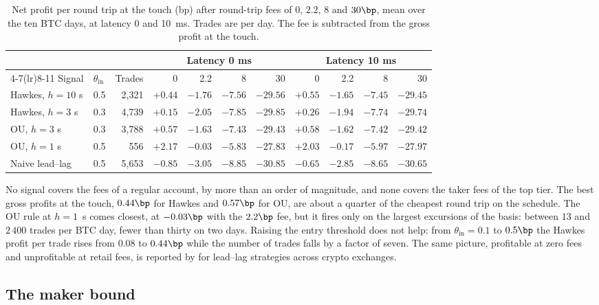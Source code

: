 \documentclass[a4paper,11pt]{article}
\begin{document}
\begin{table}[!htb]
\centering
\caption{Net profit per round trip at the touch (bp) after round-trip fees of $0$, $2.2$, $8$ and $30\bp$, mean over the ten BTC days, at latency 0 and 10~ms. Trades are per day. The fee is subtracted from the gross profit at the touch.}
\label{tab:costs}
\footnotesize
\setlength{\tabcolsep}{4pt}
\begin{tabular}{@{}llrrrrrrrrr@{}}
\toprule
 & & & \multicolumn{4}{c}{Latency 0 ms} & \multicolumn{4}{c}{Latency 10 ms} \\
\cmidrule(lr){4-7}\cmidrule(lr){8-11}
Signal & $\theta_{\mathrm{in}}$ & Trades & 0 & 2.2 & 8 & 30 & 0 & 2.2 & 8 & 30 \\
\midrule
Hawkes, $h = 10$ s & 0.5 & 2,321 & $+0.44$ & $-1.76$ & $-7.56$ & $-29.56$ & $+0.55$ & $-1.65$ & $-7.45$ & $-29.45$ \\
Hawkes, $h = 3$ s & 0.3 & 4,739 & $+0.15$ & $-2.05$ & $-7.85$ & $-29.85$ & $+0.26$ & $-1.94$ & $-7.74$ & $-29.74$ \\
OU, $h = 3$ s & 0.3 & 3,788 & $+0.57$ & $-1.63$ & $-7.43$ & $-29.43$ & $+0.58$ & $-1.62$ & $-7.42$ & $-29.42$ \\
OU, $h = 1$ s & 0.5 & 556 & $+2.17$ & $-0.03$ & $-5.83$ & $-27.83$ & $+2.03$ & $-0.17$ & $-5.97$ & $-27.97$ \\
Naive lead--lag & 0.5 & 5,653 & $-0.85$ & $-3.05$ & $-8.85$ & $-30.85$ & $-0.65$ & $-2.85$ & $-8.65$ & $-30.65$ \\
\bottomrule
\end{tabular}
\end{table}

No signal covers the fees of a regular account, by more than an order of magnitude, and none covers the taker fees of the top tier. The best gross profits at the touch, $0.44\bp$ for Hawkes and $0.57\bp$ for OU, are about a quarter of the cheapest round trip on the schedule. The OU rule at $h = 1$~s comes closest, at $-0.03\bp$ with the $2.2\bp$ fee, but it fires only on the largest excursions of the basis: between $13$ and $2\,400$ trades per BTC day, fewer than thirty on two days. Raising the entry threshold does not help: from $\theta_{\mathrm{in}} = 0.1$ to $0.5\bp$ the Hawkes profit per trade rises from $0.08$ to $0.44\bp$ while the number of trades falls by a factor of seven. The same picture, profitable at zero fees and unprofitable at retail fees, is reported by \cite{he2022} for lead--lag strategies across crypto exchanges.

\subsection{The maker bound}
\end{document}
